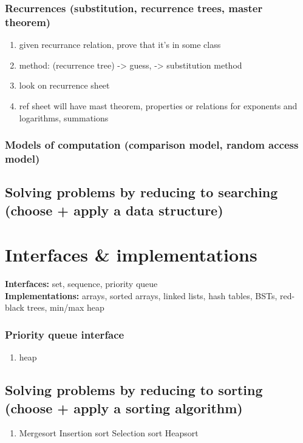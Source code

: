 \documentclass{article}
\begin{document}
        \subsubsection{Recurrences (substitution, recurrence trees, master theorem)}
        \begin{enumerate}
            \item given recurrance relation, prove that it's in some class
            \item method: (recurrence tree) -> guess, -> substitution method
            \item look on recurrence sheet 
            \item ref sheet will have mast theorem, properties or relations for exponents and logarithms, summations
        \end{enumerate}
        \subsubsection{Models of computation (comparison model, random access model)}
    \subsection{Solving problems by reducing to searching (choose + apply a data structure)
}


\section{Interfaces \& implementations}

    \textbf{Interfaces:} set, sequence, priority queue\\
    \textbf{Implementations:} arrays, sorted arrays, linked lists, hash tables, BSTs, red-black trees, min/max heap

\subsubsection{Priority queue interface}
\begin{enumerate}
    \item heap
\end{enumerate}
\subsection{Solving problems by reducing to sorting (choose + apply a sorting algorithm)}
\begin{enumerate}
    \item Mergesort
    Insertion sort
    Selection sort
    Heapsort
    
\end{enumerate}
\end{document}

